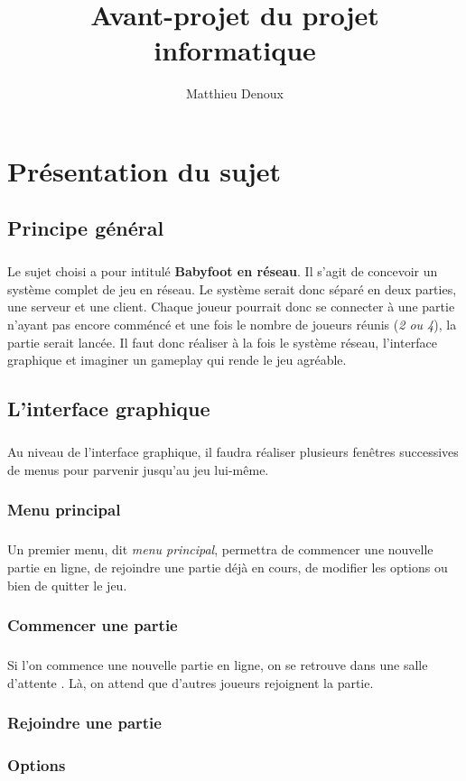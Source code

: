 \documentclass[a4paper,12pt]{report} %
\title{Avant-projet du projet informatique}
\author{Matthieu Denoux}
\begin{document}
\maketitle
\tableofcontents
\chapter{Présentation du sujet}
\section{Principe général}
\paragraph{}
Le sujet choisi a pour intitulé \textbf{Babyfoot en réseau}. Il s'agit de concevoir un système complet de jeu en réseau.
Le système serait donc séparé en deux parties, une serveur et une client. Chaque joueur pourrait donc se connecter à une partie
n'ayant pas encore comméncé et une fois le nombre de joueurs réunis (\emph{2 ou 4}), la partie serait lancée. Il faut donc réaliser à la fois 
le système réseau, l'interface graphique et imaginer un gameplay qui rende le jeu agréable.
\section{L'interface graphique}
\paragraph{}
Au niveau de l'interface graphique, il faudra réaliser plusieurs fenêtres successives de menus pour parvenir jusqu'au jeu lui-même.
\subsection{Menu principal}
\paragraph{}
Un premier menu, dit \emph{menu principal}, permettra de commencer une nouvelle partie en ligne, de rejoindre une partie
déjà en cours, de modifier les options ou bien de quitter le jeu.
\subsection{Commencer une partie}
\paragraph{}
Si l'on commence une nouvelle partie en ligne, on se retrouve dans une \og salle d'attente \fg. Là, on attend que d'autres joueurs
rejoignent la partie. 
\subsection{Rejoindre une partie}
\paragraph{}
\subsection{Options}
\paragraph{}
\end{document}
